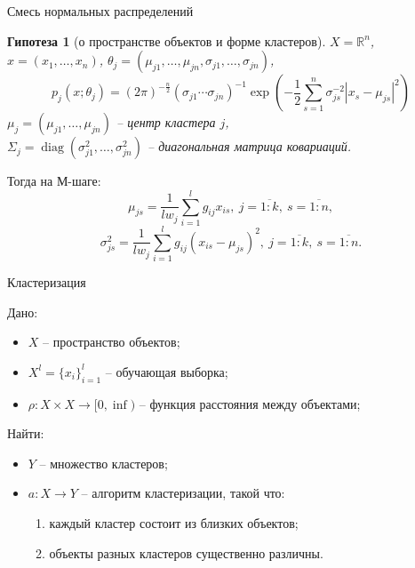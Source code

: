 \documentclass[unicode, notheorems, pdf]{beamer}
\DeclareMathOperator*{\diag}{diag}
\newtheorem{hypotesys}{Гипотеза}
\begin{document}
\begin{frame}{Смесь нормальных распределений}
	
	\begin{hypotesys}[о пространстве объектов и форме кластеров]
		$X=\mathbb{R}^n$, $x=(x_1, \dots, x_n)$, $\theta_j = (\mu_{j1}, \dots, \mu_{jn}, \sigma_{j1}, \dots, \sigma_{jn})$,
		\[p_j(x; \theta_j) = (2 \pi)^{-\frac{n}{2}} (\sigma_{j1} \cdots \sigma_{jn})^{-1} \exp(-\frac{1}{2} \sum_{s=1}^n \sigma_{js}^{-2} |x_s-\mu_{js}|^2)\]
		$\mu_j = (\mu_{j1}, \dots, \mu_{jn})$ -- центр кластера $j$,\\
		$\Sigma_j = \diag(\sigma_{j1}^2, \dots, \sigma_{jn}^2)$ -- диагональная матрица ковариаций.
	\end{hypotesys}

	\pause
	\vspace{.25cm}
	Тогда на М-шаге:
	\[\mu_{js} = \frac{1}{l w_j}\sum_{i=1}^l g_{ij} x_{is}, \: j = \overline{1:k}, \: s = \overline{1:n},\]
	\[\sigma_{js}^2 = \frac{1}{l w_j} \sum_{i=1}^l g_{ij} (x_{is
	} - \mu_{js})^2, \: j = \overline{1:k}, \: s = \overline{1:n}.\]
\end{frame}

\title[Кластеризация]{}

\begin{frame}{Кластеризация}

	Дано:
	\begin{itemize}
		\item $X$ -- пространство объектов;
		\item $X^l=\{x_i\}^l_{i=1}$ -- обучающая выборка;
		\item $\rho:X\times X\to[0,\inf)$ -- функция расстояния между объектами;
	\end{itemize}
	\vspace{0.5cm}
	Найти:
	\begin{itemize}
		\item $Y$ -- множество кластеров;
		\item $a:X\to Y$ -- алгоритм кластеризации, такой что:
		\begin{enumerate}[---]
			\item каждый кластер состоит из близких объектов;
			\item объекты разных кластеров существенно различны.
		\end{enumerate}
	\end{itemize}
\end{frame}
\end{document}
